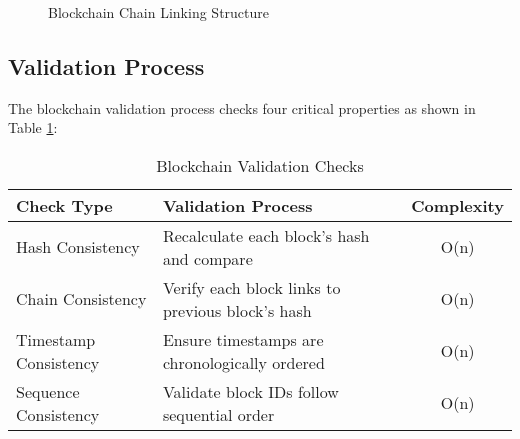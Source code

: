 \documentclass[12pt,a4paper]{article}
\begin{document}
\begin{figure}[h]
\centering
{}
\caption{Blockchain Chain Linking Structure}
\label{fig:blockchain-chain}
\end{figure}

\subsection{Validation Process}

The blockchain validation process checks four critical properties as shown in Table \ref{tab:validation-checks}:

\begin{table}[h]
\centering
\begin{tabular}{|l|p{8cm}|c|}
\hline
\textbf{Check Type} & \textbf{Validation Process} & \textbf{Complexity} \\
\hline
Hash Consistency & Recalculate each block's hash and compare & O(n) \\
\hline
Chain Consistency & Verify each block links to previous block's hash & O(n) \\
\hline
Timestamp Consistency & Ensure timestamps are chronologically ordered & O(n) \\
\hline
Sequence Consistency & Validate block IDs follow sequential order & O(n) \\
\hline
\end{tabular}
\caption{Blockchain Validation Checks}
\label{tab:validation-checks}
\end{table}
\end{document}
